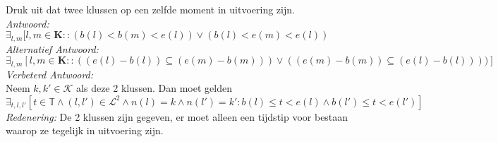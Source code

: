 
\item Druk uit dat twee klussen op een zelfde moment in uitvoering zijn. \\


\emph{Antwoord:} $ \exists_{l,m}[ l,m \in \textbf{K} : : ( b(l) < b(m) < e(l) ) \lor ( b(l) < e(m) < e(l) ) $\\
\emph{Alternatief Antwoord:} \\
$\exists_{l,m}[ l,m \in \textbf{K} : : ( (e(l) - b(l) ) \subseteq (e(m) - b(m))  ) \lor ( (e(m) - b(m) ) \subseteq (e(l) - b(l))  ) ) ] $ \\

\emph{Verbeterd Antwoord:} \\
Neem $k, k' \in \mathcal{K}$ als deze 2 klussen. Dan moet gelden \\
$\exists_{t, l, l'} [t \in \mathbb{T} \wedge (l, l') \in \mathcal{L}^2 \wedge n(l)=k \wedge n(l')=k' : b(l) \leq t < e(l) \wedge b(l') \leq t < e(l')]$ \\
\emph{Redenering:} De 2 klussen zijn gegeven, er moet alleen een tijdstip voor bestaan waarop ze tegelijk in uitvoering zijn. \\
